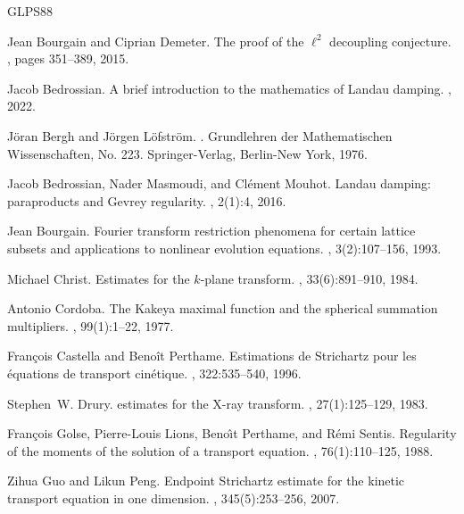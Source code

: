 \documentclass[11pt,a4paper,reqno]{amsart}
\theoremstyle{plain}
\theoremstyle{remark}
\begin{document}
\begin{thebibliography}{GLPS88}

Jean Bourgain and Ciprian Demeter.
\newblock The proof of the $\ell^2$ decoupling conjecture.
, pages 351--389, 2015.

Jacob Bedrossian.
\newblock A brief introduction to the mathematics of {L}andau damping.
, 2022.

J\"{o}ran Bergh and J\"{o}rgen L\"{o}fstr\"{o}m.
.
\newblock Grundlehren der Mathematischen Wissenschaften, No. 223. Springer-Verlag, Berlin-New York, 1976.

Jacob Bedrossian, Nader Masmoudi, and Cl{\'e}ment Mouhot.
\newblock Landau damping: paraproducts and {G}evrey regularity.
, 2(1):4, 2016.

Jean Bourgain.
\newblock Fourier transform restriction phenomena for certain lattice subsets and applications to nonlinear evolution equations.
, 3(2):107--156, 1993.

Michael Christ.
\newblock Estimates for the $k$-plane transform.
, 33(6):891--910, 1984.

Antonio Cordoba.
\newblock The {K}akeya maximal function and the spherical summation multipliers.
, 99(1):1--22, 1977.

François Castella and Benoît Perthame.
\newblock Estimations de {S}trichartz pour les équations de transport cinétique.
, 322:535--540, 1996.

Stephen~W. Drury.
 estimates for the {X}-ray transform.
, 27(1):125--129, 1983.

Fran{\c{c}}ois Golse, Pierre-Louis Lions, Beno{\^\i}t Perthame, and R{\'e}mi Sentis.
\newblock Regularity of the moments of the solution of a transport equation.
, 76(1):110--125, 1988.

Zihua Guo and Likun Peng.
\newblock Endpoint {S}trichartz estimate for the kinetic transport equation in one dimension.
, 345(5):253--256, 2007.


\end{thebibliography}
\end{document}

